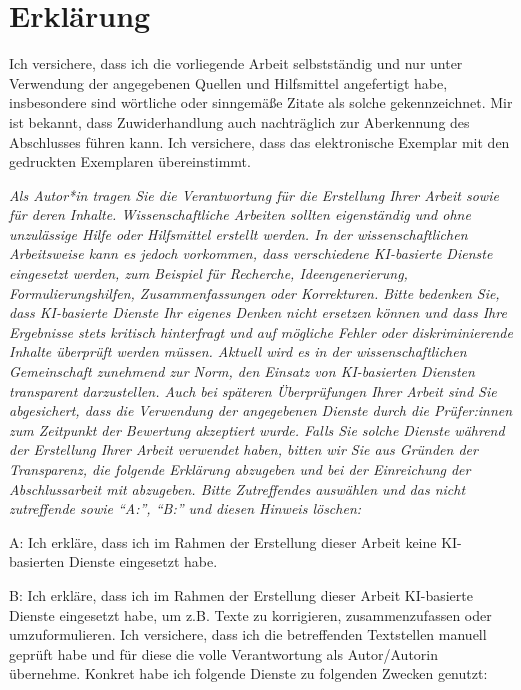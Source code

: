 \chapter*{Erklärung}
\thispagestyle{empty}
Ich versichere, dass ich die vorliegende Arbeit selbstständig und nur unter Verwendung der angegebenen Quellen und Hilfsmittel angefertigt habe, insbesondere sind wörtliche oder sinngemäße Zitate als solche gekennzeichnet.
Mir ist bekannt, dass Zuwiderhandlung auch nachträglich zur Aberkennung des Abschlusses führen kann.
Ich versichere, dass das elektronische Exemplar mit den gedruckten Exemplaren übereinstimmt.

\emph{
Als Autor*in tragen Sie die Verantwortung für die Erstellung Ihrer Arbeit sowie für deren Inhalte.
Wissenschaftliche Arbeiten sollten eigenständig und ohne unzulässige Hilfe oder Hilfsmittel erstellt werden.
In der wissenschaftlichen Arbeitsweise kann es jedoch vorkommen, dass verschiedene KI-basierte Dienste eingesetzt werden, zum Beispiel für Recherche, Ideengenerierung, Formulierungshilfen, Zusammenfassungen oder Korrekturen.
Bitte bedenken Sie, dass KI-basierte Dienste Ihr eigenes Denken nicht ersetzen können und dass Ihre Ergebnisse stets kritisch hinterfragt und auf mögliche Fehler oder diskriminierende Inhalte überprüft werden müssen.
Aktuell wird es in der wissenschaftlichen Gemeinschaft zunehmend zur Norm, den Einsatz von KI-basierten Diensten transparent darzustellen.
Auch bei späteren Überprüfungen Ihrer Arbeit sind Sie abgesichert, dass die Verwendung der angegebenen Dienste durch die Prüfer:innen zum Zeitpunkt der Bewertung akzeptiert wurde.
Falls Sie solche Dienste während der Erstellung Ihrer Arbeit verwendet haben, bitten wir Sie aus Gründen der Transparenz, die folgende Erklärung abzugeben und bei der Einreichung der Abschlussarbeit mit abzugeben.
Bitte Zutreffendes auswählen und das nicht zutreffende sowie \enquote{A:}, \enquote{B:} und diesen Hinweis löschen:
}

\bigskip

A: Ich erkläre, dass ich im Rahmen der Erstellung dieser Arbeit keine KI-basierten Dienste eingesetzt habe.

B: Ich erkläre, dass ich im Rahmen der Erstellung dieser Arbeit KI-basierte Dienste eingesetzt habe, um z.B. Texte zu korrigieren, zusammenzufassen oder umzuformulieren.
Ich versichere, dass ich die betreffenden Textstellen manuell geprüft habe und für diese die volle Verantwortung als Autor/Autorin übernehme. Konkret habe ich folgende Dienste zu folgenden Zwecken genutzt:

